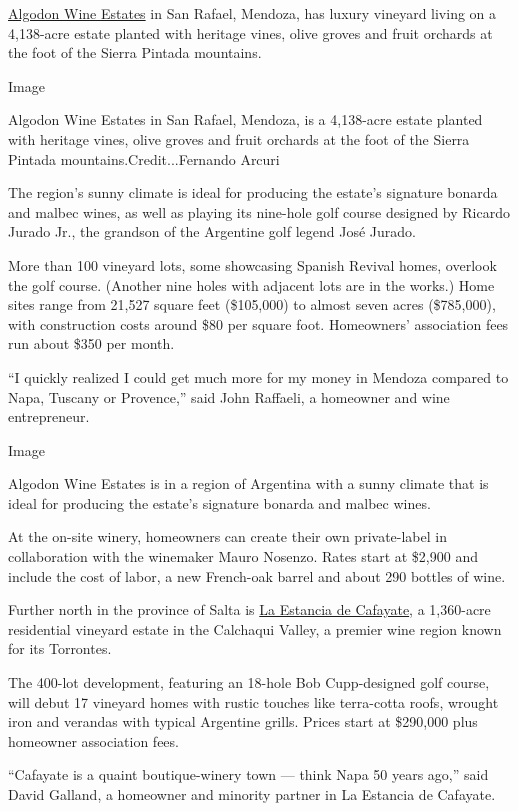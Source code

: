 \href{https://www.algodonwineestates.com/}{Algodon Wine Estates} in San
Rafael, Mendoza, has luxury vineyard living on a 4,138-acre estate
planted with heritage vines, olive groves and fruit orchards at the foot
of the Sierra Pintada mountains.

Image

Algodon Wine Estates in San Rafael, Mendoza, is a 4,138-acre estate
planted with heritage vines, olive groves and fruit orchards at the foot
of the Sierra Pintada mountains.Credit...Fernando Arcuri

The region's sunny climate is ideal for producing the estate's signature
bonarda and malbec wines, as well as playing its nine-hole golf course
designed by Ricardo Jurado Jr., the grandson of the Argentine golf
legend José Jurado.

More than 100 vineyard lots, some showcasing Spanish Revival homes,
overlook the golf course. (Another nine holes with adjacent lots are in
the works.) Home sites range from 21,527 square feet (\$105,000) to
almost seven acres (\$785,000), with construction costs around \$80 per
square foot. Homeowners' association fees run about \$350 per month.

``I quickly realized I could get much more for my money in Mendoza
compared to Napa, Tuscany or Provence,'' said John Raffaeli, a homeowner
and wine entrepreneur.

Image

Algodon Wine Estates is in a region of Argentina with a sunny climate
that is ideal for producing the estate's signature bonarda and malbec
wines.

At the on-site winery, homeowners can create their own private-label in
collaboration with the winemaker Mauro Nosenzo. Rates start at \$2,900
and include the cost of labor, a new French-oak barrel and about 290
bottles of wine.

Further north in the province of Salta is
\href{http://www.lec.com.ar/}{La Estancia de Cafayate}, a 1,360-acre
residential vineyard estate in the Calchaqui Valley, a premier wine
region known for its Torrontes.

The 400-lot development, featuring an 18-hole Bob Cupp-designed golf
course, will debut 17 vineyard homes with rustic touches like
terra-cotta roofs, wrought iron and verandas with typical Argentine
grills. Prices start at \$290,000 plus homeowner association fees.

``Cafayate is a quaint boutique-winery town --- think Napa 50 years
ago,'' said David Galland, a homeowner and minority partner in La
Estancia de Cafayate.

